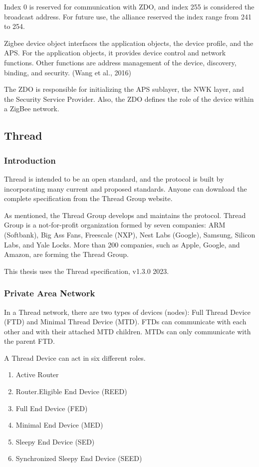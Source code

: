 Index 0 is reserved for communication with ZDO, and index 255 is considered the broadcast address.
For future use, the alliance reserved the index range from 241 to 254.

Zigbee device object interfaces the application objects, the device profile, and the APS. For the application objects, it provides device control and network functions. Other functions are address management of the device, discovery, binding, and security. (Wang et al., 2016)

The ZDO is responsible for initializing the APS sublayer, the NWK layer, and the Security Service Provider. Also, the ZDO defines the role of the device within a ZigBee network.

\subsection{Thread}
\label{sec:ot}

\subsubsection{Introduction}
\label{sec:ot:intro}
Thread is intended to be an open standard, and the protocol is built by incorporating many
current and proposed standards.\cite{unwala:2018}
Anyone can download the complete specification from the Thread Group website. \cite{thread:130}

As mentioned, the Thread Group develops and maintains the protocol.
Thread Group is a not-for-profit organization formed by seven companies:
ARM (Softbank), Big Ass Fans, Freescale (NXP), Nest Labs (Google), Samsung, Silicon Labs, and Yale Locks.
More than 200 companies, such as Apple, Google, and Amazon, are forming the Thread Group. \cite{thread:members}

This thesis uses the Thread specification, v1.3.0 2023.

\subsubsection{Private Area Network}
\label{sec:ot:pan}
In a Thread network, there are two types of devices (nodes): Full Thread Device (FTD) and Minimal Thread Device (MTD). FTDs can communicate with each other and with their attached MTD children. MTDs can only communicate with the parent FTD.

A Thread Device can act in six different roles.
\begin{enumerate}
    \item Active Router
    \item Router.Eligible End Device (REED)
    \item Full End Device (FED)
    \item Minimal End Device (MED)
    \item Sleepy End Device (SED)
    \item Synchronized Sleepy End Device (SEED)
\end{enumerate}

